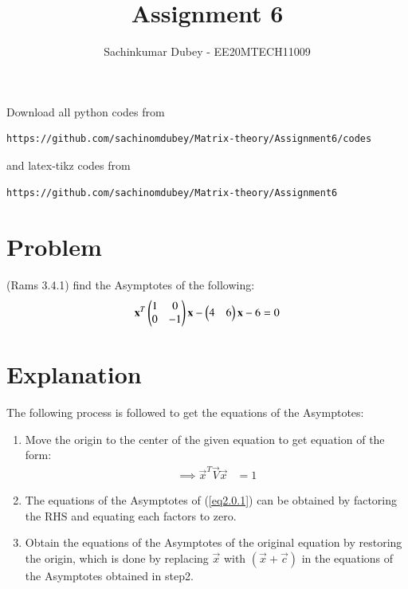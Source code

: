 \documentclass[journal,12pt,twocolumn]{IEEEtran}
\begin{document}
\def\putbox#1#2#3{\makebox[0in][l]{\makebox[#1][l]{}\raisebox{\baselineskip}[0in][0in]{\raisebox{#2}[0in][0in]{#3}}}}
     \def\rightbox#1{\makebox[0in][r]{#1}}
     \def\centbox#1{\makebox[0in]{#1}}
     \def\topbox#1{\raisebox{-\baselineskip}[0in][0in]{#1}}
     \def\midbox#1{\raisebox{-0.5\baselineskip}[0in][0in]{#1}}
\vspace{3cm}
\title{Assignment 6}
\author{Sachinkumar Dubey - EE20MTECH11009}
\maketitle
\newpage
\bigskip
\renewcommand{\thefigure}{\theenumi}
\renewcommand{\thetable}{\theenumi}
Download all python codes from 
\begin{lstlisting}
https://github.com/sachinomdubey/Matrix-theory/Assignment6/codes
\end{lstlisting}
%
and latex-tikz codes from 
%
\begin{lstlisting}
https://github.com/sachinomdubey/Matrix-theory/Assignment6
\end{lstlisting}
\section{Problem}
(Rams 3.4.1) find the Asymptotes of the following:\\
\begin{align}
\mathbf{x}^T\begin{pmatrix}1 & 0\\0 & -1\end{pmatrix}\mathbf{x}-\begin{pmatrix}4 & 6\end{pmatrix}\mathbf{x}-6=0
\end{align}
\section{Explanation}
The following process is followed to get the equations of the Asymptotes:
\begin{enumerate}
    \item Move the origin to the center of the given equation to get equation of the form:
    \begin{align}
    \implies\vec{x}^T\vec{V}\vec{x}&=1 \label{eq2.0.1}
    \end{align}
    \item The equations of the Asymptotes of (\ref{eq2.0.1}) can be obtained by factoring the RHS and equating each factors to zero.
    \item Obtain the equations of the Asymptotes of the original equation by restoring the origin, which is done by replacing $\Vec{x}$ with $(\Vec{x}+\Vec{c})$ in the equations of the Asymptotes obtained in step2.
\end{enumerate}
\end{document}
